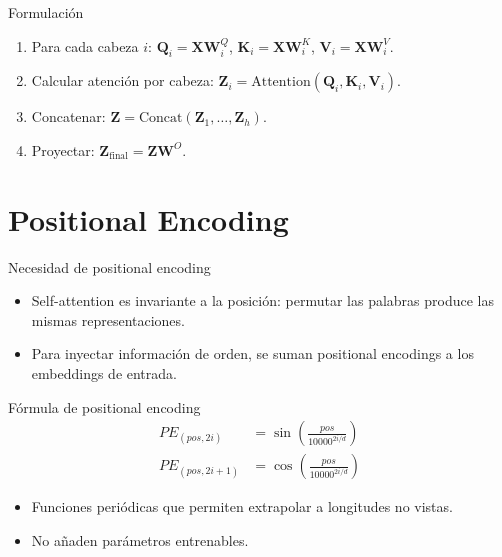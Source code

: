 \documentclass[aspectratio=169, 10pt, xcolor=table]{beamer}
\begin{document}
\begin{frame}{Formulación}
    \begin{enumerate}
        \item Para cada cabeza $i$: $\mathbf{Q}_i = \mathbf{X}\mathbf{W}_i^Q$, $\mathbf{K}_i = \mathbf{X}\mathbf{W}_i^K$, $\mathbf{V}_i = \mathbf{X}\mathbf{W}_i^V$.
        \item Calcular atención por cabeza: $\mathbf{Z}_i = \text{Attention}(\mathbf{Q}_i, \mathbf{K}_i, \mathbf{V}_i)$.
        \item Concatenar: $\mathbf{Z} = \text{Concat}(\mathbf{Z}_1, \dots, \mathbf{Z}_h)$.
        \item Proyectar: $\mathbf{Z}_{\text{final}} = \mathbf{Z}\mathbf{W}^O$.
    \end{enumerate}
\end{frame}

\section{Positional Encoding}

\begin{frame}{Necesidad de positional encoding}
    \begin{itemize}
        \item Self-attention es invariante a la posición: permutar las palabras produce las mismas representaciones.
        \item Para inyectar información de orden, se suman positional encodings a los embeddings de entrada.
    \end{itemize}
\end{frame}

\begin{frame}{Fórmula de positional encoding}
    \[
    \begin{align*}
        PE_{(pos, 2i)} &= \sin\left(\frac{pos}{10000^{2i/d}}\right) \\
        PE_{(pos, 2i+1)} &= \cos\left(\frac{pos}{10000^{2i/d}}\right)
    \end{align*}
    \]
    \begin{itemize}
        \item Funciones periódicas que permiten extrapolar a longitudes no vistas.
        \item No añaden parámetros entrenables.
    \end{itemize}
\end{frame}
\end{document}

